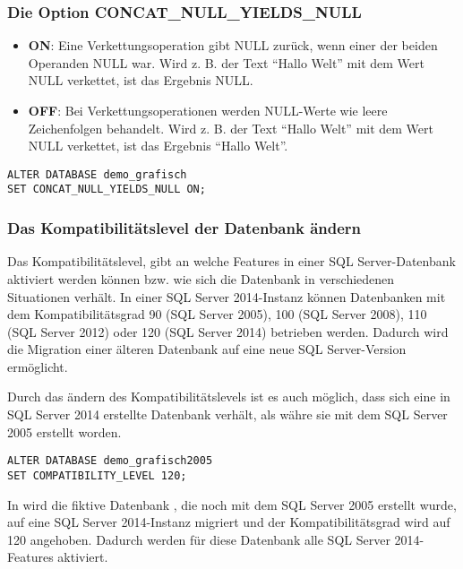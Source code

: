         \subsubsection{Die Option CONCAT\_NULL\_YIELDS\_NULL}
          \begin{itemize}
              \item \textbf{ON}: Eine Verkettungsoperation gibt NULL zurück,
              wenn einer der beiden Operanden NULL war. Wird z. B. der Text
              \enquote{Hallo Welt} mit dem Wert NULL verkettet, ist das
              Ergebnis NULL.
              \item \textbf{OFF}: Bei Verkettungsoperationen werden NULL-Werte
              wie leere Zeichenfolgen behandelt. Wird z. B. der Text
              \enquote{Hallo Welt} mit dem Wert NULL verkettet, ist das Ergebnis
              \enquote{Hallo Welt}.
          \end{itemize}
          \begin{lstlisting}[language=ms_sql,caption={Behandlung
          von NULL-Werten bei Verkettungsoperationen steuern},label=admin03_17]
ALTER DATABASE demo_grafisch 
SET CONCAT_NULL_YIELDS_NULL ON;
          \end{lstlisting}          
        \subsubsection{Das Kompatibilitätslevel der Datenbank ändern}        
          Das Kompatibilitätslevel, gibt an welche Features in einer SQL
          Server-Datenbank aktiviert werden können bzw. wie sich die Datenbank
          in verschiedenen Situationen verhält. In einer SQL Server 2014-Instanz
          können Datenbanken mit dem Kompatibilitätsgrad 90 (SQL Server 2005),
          100 (SQL Server 2008), 110 (SQL Server 2012) oder 120 (SQL
          Server 2014) betrieben werden. Dadurch wird die Migration einer
          älteren Datenbank auf eine neue SQL Server-Version ermöglicht.
          
          Durch das ändern des Kompatibilitätslevels ist es auch möglich, dass
          sich eine in SQL Server 2014 erstellte Datenbank verhält, als währe
          sie mit dem SQL Server 2005 erstellt worden.
          \begin{lstlisting}[language=ms_sql,caption={Ändern
          des Kompatibilitätslevels einer Datenbank},label=admin03_18]
ALTER DATABASE demo_grafisch2005
SET COMPATIBILITY_LEVEL 120;
          \end{lstlisting}
          In  wird die fiktive Datenbank
          , die noch mit dem SQL Server 2005
          erstellt wurde, auf eine SQL Server 2014-Instanz migriert und der
          Kompatibilitätsgrad wird auf 120 angehoben. Dadurch werden für diese
          Datenbank alle SQL Server 2014-Features aktiviert.          
